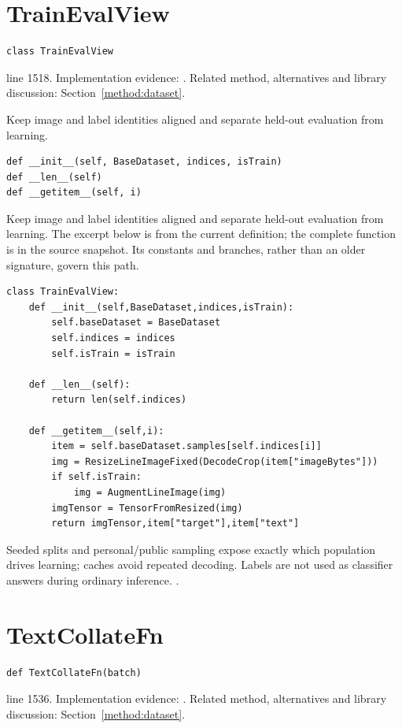 \section{TrainEvalView}\label{fn:train:TrainEvalView}
\begin{lstlisting}[style=sig]
class TrainEvalView
\end{lstlisting}
 line 1518. Implementation evidence: \cite{code2026}. Related method, alternatives and library discussion: Section~\ref{method:dataset}.


Keep image and label identities aligned and separate held-out evaluation from learning.


\begin{lstlisting}[style=plain]
def __init__(self, BaseDataset, indices, isTrain)
def __len__(self)
def __getitem__(self, i)
\end{lstlisting}
Keep image and label identities aligned and separate held-out evaluation from learning. The excerpt below is from the current definition; the complete function is in the source snapshot. Its constants and branches, rather than an older signature, govern this path.


\begin{lstlisting}[style=plain]
class TrainEvalView:
    def __init__(self,BaseDataset,indices,isTrain):
        self.baseDataset = BaseDataset
        self.indices = indices
        self.isTrain = isTrain

    def __len__(self):
        return len(self.indices)

    def __getitem__(self,i):
        item = self.baseDataset.samples[self.indices[i]]
        img = ResizeLineImageFixed(DecodeCrop(item["imageBytes"]))
        if self.isTrain:
            img = AugmentLineImage(img)
        imgTensor = TensorFromResized(img)
        return imgTensor,item["target"],item["text"]
\end{lstlisting}
Seeded splits and personal/public sampling expose exactly which population drives learning; caches avoid repeated decoding. Labels are not used as classifier answers during ordinary inference. \cite{marti2002,code2026,torchdata}.


\section{TextCollateFn}\label{fn:train:TextCollateFn}
\begin{lstlisting}[style=sig]
def TextCollateFn(batch)
\end{lstlisting}
 line 1536. Implementation evidence: \cite{code2026}. Related method, alternatives and library discussion: Section~\ref{method:dataset}.


